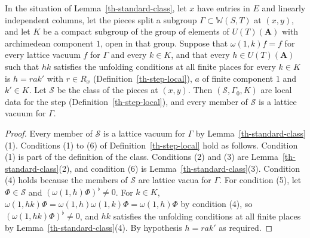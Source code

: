 \begin{lemma}\label{th-standard-local-data}
In the situation of Lemma~\ref{th-standard-class}, let $x$ have entries in $E$ and
linearly independent columns, let the pieces split a subgroup
$\Gamma\subset\mathbb W(S,T)$ at $(x,y)$, and let $K$ be a compact subgroup of the
group of elements of $U(T)(\mathbf A)$ with archimedean component $1$, open in
that group. Suppose that $\omega(1,k)f=f$ for every lattice vacuum $f$ for
$\Gamma$ and every $k\in K$, and that every $h\in U(T)(\mathbf A)$ such that $hk$
satisfies the unfolding conditions at all finite places for every $k\in K$ is
$h=rak'$ with $r\in R_x$ (Definition~\ref{th-step-local}), $a$ of finite
component $1$ and $k'\in K$. Let $\mathcal S$ be the class of the pieces at
$(x,y)$. Then $(\mathcal S,\Gamma_0,K)$ are local data for the step
(Definition~\ref{th-step-local}), and every member of $\mathcal S$ is a lattice
vacuum for $\Gamma$.
\end{lemma}
\begin{proof}
Every member of $\mathcal S$ is a lattice vacuum for $\Gamma$ by
Lemma~\ref{th-standard-class}(1). Conditions (1) to (6) of
Definition~\ref{th-step-local} hold as follows. Condition (1) is part of the
definition of the class. Conditions (2) and (3) are
Lemma~\ref{th-standard-class}(2), and condition (6) is
Lemma~\ref{th-standard-class}(3). Condition (4) holds because the members of
$\mathcal S$ are lattice vacua for $\Gamma$. For condition (5), let
$\Phi\in\mathcal S$ and $(\omega(1,h)\Phi)^\flat\neq0$. For $k\in K$,
$\omega(1,hk)\Phi=\omega(1,h)\omega(1,k)\Phi=\omega(1,h)\Phi$ by condition (4),
so $(\omega(1,hk)\Phi)^\flat\neq0$, and $hk$ satisfies the unfolding conditions
at all finite places by Lemma~\ref{th-standard-class}(4). By hypothesis $h=rak'$
as required.
\end{proof}

